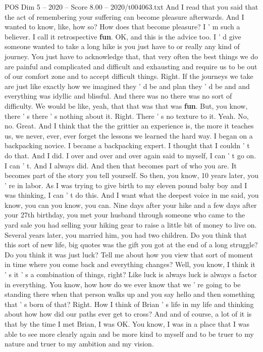 \begin{textsample}{POS Dim 5 – 2020 – Score 8.00 – 2020/t004063.txt}
And I read that you said that the act of remembering your suffering can become pleasure afterwards.
And I wanted to know, like, how so?
How does that become pleasure?
I ' m such a believer.
I call it retrospective \textbf{fun}.
OK, and this is the advice too.
I ' d give someone wanted to take a long hike is you just have to or really any kind of journey.
You just have to acknowledge that, that very often the best things we do are painful and complicated and difficult and exhausting and require us to be out of our comfort zone and to accept difficult things.
Right.
If the journeys we take are just like exactly how we imagined they ' d be and plan they ' d be and and everything was idyllic and blissful.
And there was no there was no sort of difficulty.
We would be like, yeah, that that was that was \textbf{fun}.
But, you know, there ' s there ' s nothing about it.
Right.
There ' s no texture to it.
Yeah.
No, no.
Great.
And I think that the the grittier an experience is, the more it teaches us, we never, ever, ever forget the lessons we learned the hard way.
I began on a backpacking novice.
I became a backpacking expert.
I thought that I couldn ' t do that.
And I did.
I over and over and over again said to myself, I can ' t go on.
I can ' t.
And I always did.
And then that becomes part of who you are.
It becomes part of the story you tell yourself.
So then, you know, 10 years later, you ' re in labor.
As I was trying to give birth to my eleven pound baby boy and I was thinking, I can ' t do this.
And I want what the deepest voice in me said, you know, you can you know, you can.
Nine days after your hike and a few days after your 27th birthday, you met your husband through someone who came to the yard sale you had selling your hiking gear to raise a little bit of money to live on.
Several years later, you married him, you had two children.
Do you think that this sort of new life, big quotes was the gift you got at the end of a long struggle?
Do you think it was just luck?
Tell me about how you view that sort of moment in time where you come back and everything changes?
Well, you know, I think it ' s it ' s a combination of things, right?
Like luck is always luck is always a factor in everything.
You know, how how do we ever know that we ' re going to be standing there when that person walks up and you say hello and then something that ' s born of that?
Right.
How I think of Brian ' s life in my life and thinking about how how did our paths ever get to cross?
And and of course, a lot of it is that by the time I met Brian, I was OK.
You know, I was in a place that I was able to see more clearly again and be more kind to myself and to be truer to my nature and truer to my ambition and my vision.

\end{textsample}

